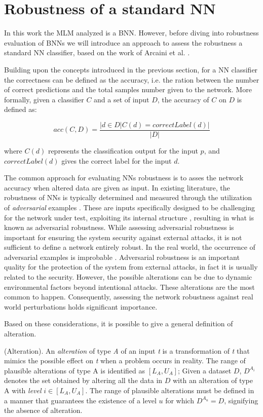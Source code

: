 \section{Robustness of a standard NN}
In this work the MLM analyzed is a BNN. However, before diving into robustness evaluation of BNNs we will introduce an approach to assess the robustness a standard NN classifier, based on the work of Arcaini et al. \cite{9176802}.

Building upon the concepts introduced in the previous section, for a NN classifier the correctness can be defined as the accuracy, i.e. the ration between the number of correct predictions and the total samples number given to the network. More formally, given a classifier $C$ and a set of input $D$, the accuracy of $C$ on $D$ is defined as:

\[
	acc(C,D) = \frac{|{d \in D | C(d) = correctLabel(d)}|}{|D|}
\] 

where $C(d)$ represents the classification output for the input $p$, and $correctLabel(d)$ gives the correct label for the input $d$.

The common approach for evaluating NNs robustness is to asses the network accuracy when altered data are given as input.
In existing literature, the robustness of NNs is typically determined and measured through the utilization of \textit{adversarial} examples \cite{rnnvta2018} \cite{9785704}. These are inputs specifically designed to be challenging for the network under test, exploiting its internal structure \cite{759851e20d2e47aaad2a560211f6a126}, resulting in what is known as adversarial robustness.
While assessing adversarial robustness is important for ensuring the system security against external attacks, it is not sufficient to define a network entirely robust.
In the real world, the occurrence of adversarial examples is improbable \cite{8805674}.
Adversarial robustness is an important quality for the protection of the system from external attacks, in fact it is usually related to the security. However, the possible alterations can be due to dynamic environmental factors beyond intentional attacks. These alterations are the most common to happen. Consequently, assessing the network robustness against real world perturbations holds significant importance.

Based on these considerations, it is possible to give a general definition of alteration.

\begin{definition} (Alteration).
	An \textit{alteration} of type \textit{A} of an input \textit{t} is a transformation of \textit{t} that mimics the possible effect on \textit{t} when a problem occurs in reality. The range of plausible alterations of type A is identified as $[L_A, U_A]$; Given a dataset $D$, $D^{A_i}$ denotes the set obtained by altering all the data in $D$ with an alteration of type A with \textit{level} $i \in [L_A, U_A]$.
	The range of plausible alterations must be defined in a manner that guarantees the existence of a level $u$ for which $D^{A_u} = D$, signifying the absence of alteration. 
\end{definition}
 
